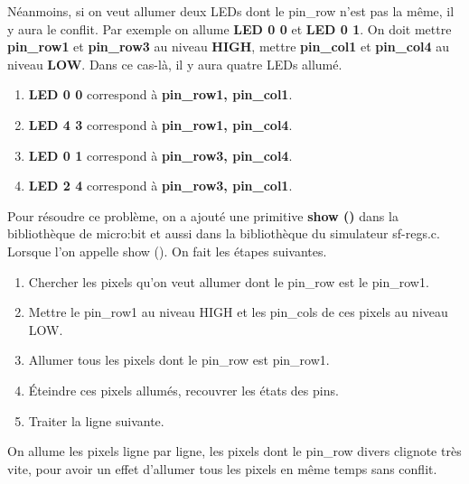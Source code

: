 \documentclass[14px]{article}
\begin{document}
	Néanmoins, si on veut allumer deux LEDs dont le pin\_row n'est pas la même, il y aura le conflit. Par exemple on allume \textbf{LED 0 0} et \textbf{LED 0 1}. On doit mettre \textbf{pin\_row1} et \textbf{pin\_row3} au niveau \textbf{HIGH}, mettre \textbf{pin\_col1} et \textbf{pin\_col4} au niveau \textbf{LOW}. Dans ce cas-là, il y aura quatre LEDs allumé.
	\begin{enumerate}
		\item \textbf{LED 0 0} correspond à \textbf{pin\_row1, pin\_col1}.
		\item \textbf{LED 4 3} correspond à \textbf{pin\_row1, pin\_col4}.
		\item \textbf{LED 0 1} correspond à \textbf{pin\_row3, pin\_col4}.
		\item \textbf{LED 2 4} correspond à \textbf{pin\_row3, pin\_col1}.
	\end{enumerate}
	\begin{figure}[htbp]
	\end{figure}

	Pour résoudre ce problème, on a ajouté une primitive \textbf{show ()} dans la bibliothèque de micro:bit et aussi dans la bibliothèque du simulateur sf-regs.c. Lorsque l'on appelle show (). On fait les étapes suivantes.
	\begin{enumerate}
		\item Chercher les pixels qu'on veut allumer dont le pin\_row est le pin\_row1.
		\item Mettre le pin\_row1 au niveau HIGH et les pin\_cols de ces pixels au niveau LOW.
		\item Allumer tous les pixels dont le pin\_row est pin\_row1.
		\item Éteindre ces pixels allumés, recouvrer les états des pins.
		\item Traiter la ligne suivante.
	\end{enumerate}
	On allume les pixels ligne par ligne, les pixels dont le pin\_row divers clignote très vite, pour avoir un effet d'allumer tous les pixels en même temps sans conflit.
\end{document}

